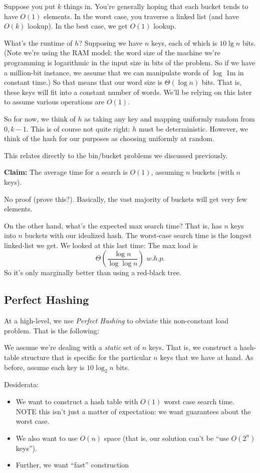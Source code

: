 \documentclass{article}
\begin{document}
Suppose you put $k$ things in.
You're generally hoping that each bucket tends to have $O(1)$ elements.
In the worst case, you traverse a linked list (and have $O(k)$ lookup).
In the best case, we get $O(1)$ lookup.

What's the runtime of $h$?
Supposing we have $n$ keys, each of which is $10\lg n$ bits.
(Note we're using the RAM  model: the word size of the machine we're
programming is logarithmic in the input size in bits of the problem.
So if we have a million-bit instance, we assume that we can manipulate
words of $\log$ 1m in constant time.)
So that means that our word size is $\Theta(\log n)$ bits.
That is, these keys will fit into a constant number of words.
We'll be relying on this later to assume various operations are $O(1)$.

So for now, we think of $h$ as taking any key and mapping uniformly
random from $0,k-1$.
This is of course not quite right: $h$ must be deterministic.
However, we think of the hash for our purposes as choosing uniformly
at random.

This relates directly to the bin/bucket problems we discussed previously.

\textbf{Claim:}
The average time for a search is $O(1)$, assuming $n$ buckets (with $n$ keys).

No proof (prove this?).
 Basically, the vast majority of buckets will get very few elements.

On the other hand, what's the expected max search time?
That is, has $n$ keys into $n$ buckets with our idealized hash.
The worst-case search time is the longest linked-list we get.
We looked at this last time:
The max load is
$$
\Theta\left(
	\frac{\log n} {\log\log n}
\right)
\,\, w.h.p.
$$
So it's only marginally better than using a red-black tree.

\subsection{Perfect Hashing}

At a high-level, we use \textit{Perfect Hashing} to obviate this
non-constant load problem.
That is the following:

We assume we're dealing with a \textit{static} set of $n$ keys.
That is, we construct a hash-table structure that is specific for the
particular $n$ keys that we have at hand.
As before, assume each key is $10\log_2 n$ bits.

Desiderata:

\begin{itemize}

\item
We want to construct a hash table with $O(1)$ worst case search time.
NOTE this isn't just a matter of expectation: we want guarantees about
the worst case.

\item
We also want to use $O(n)$ space (that is, our solution can't be ``use $O(2^n)$ keys'').

\item
Further, we want ``fast'' construction
\end{itemize}
\end{document}
